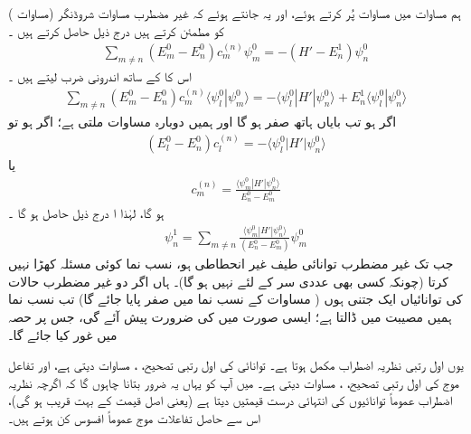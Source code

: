   ہم مساوات    میں مساوات    پُر کرتے ہوئے، اور  یہ جانتے ہوئے کہ غیر مضطرب مساوات  شروڈنگر   (مساوات )  کو  مطمئن کرتے ہیں درج ذیل حاصل کرتے ہیں ۔
\begin{align*}
\sum_{m \ne n} {(E_m^0 - E_n^0) c_m^{(n)} \psi_m^0} = - {(H' - E_n^1) \psi_n^0}
\end{align*}
اس کا  کے ساتھ اندرونی ضرب لیتے ہیں ۔
\begin{align*}
\sum_{m \ne n} (E_m^0 - E_n^0) c_m^{(n)} \langle \psi_l^0 | \psi_m^0 \rangle = - \langle \psi_l^0 | H' | \psi_n^0 \rangle + E_n^1 \langle \psi_l^0 | \psi_n^0 \rangle 
\end{align*}
اگر  ہو تب بایاں ہاتھ صفر ہو گا اور ہمیں دوبارہ مساوات    ملتی ہے؛  اگر  ہو تو 
\begin{align*}
(E_l^0 - E_n^0) c_l^{(n)} = - \langle \psi_l^0 | H' | \psi_n^0 \rangle
\end{align*}
یا 
\begin{align}\label{مساوات_غیر_اضطراب_عددی_سر_ایم}
c_m^{(n)} = \frac{\langle \psi_m^0 | H' | \psi_n^0 \rangle}{E_n^0 - E_m^0}
\end{align}
ہو گا،  لہٰذا ا درج ذیل حاصل ہو گا ۔
\begin{align}\label{مساوات_غیر_اضطراب_تفاعل_این}
\psi_n^1 = \sum_{m \ne n} \frac{\langle \psi_m^0 | H' | \psi_n^0 \rangle}{(E_n^0 - E_m^0)} \psi_m^0
\end{align}
جب تک غیر مضطرب توانائی طیف غیر انحطاطی ہو،   نسب نما  کوئی  مسئلہ کھڑا نہیں کرتا   (چونکہ کسی بھی عددی سر کے لئے   نہیں ہو گا)۔  ہاں  اگر  دو غیر مضطرب حالات کی توانائیاں ایک  جتنی ہوں   ( مساوات    کے  نسب نما میں صفر پایا جائے گا)  تب نسب نما  ہمیں مصیبت میں ڈالتا ہے؛  ایسی صورت میں  کی ضرورت پیش آئے گی، جس پر حصہ  میں غور کیا جائے گا۔ 

 یوں اول رتبی  نظریہ اضطراب مکمل ہوتا ہے۔  توانائی کی اول رتبی تصحیح،  ،  مساوات    دیتی ہے،  اور  تفاعل موج کی اول رتبی  تصحیح،  ،  مساوات  دیتی ہے۔ میں آپ کو یہاں یہ ضرور بتانا چاہوں گا کہ اگرچہ نظریہ اضطراب عموماً  توانائیوں کی انتہائی  درست قیمتیں دیتا ہے  (یعنی   اصل قیمت  کے بہت قریب ہو گی)،  اس سے حاصل تفاعلات موج عموماً   افسوس  کن  ہوتے ہیں۔  

